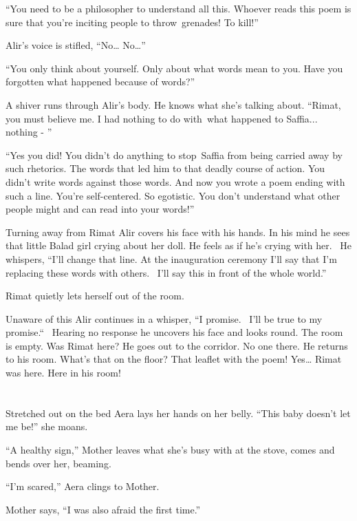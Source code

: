 \documentclass[twoside,11pt]{book}
\begin{document}
``You need to be a philosopher to understand all this. Whoever reads this poem is sure that you're inciting
people to throw~grenades! To kill!''

Alir's voice is stifled, ``No{\dots} No{\dots}''

``You only think about yourself. Only about what words mean to you. Have you forgotten what happened
because of words?''

A shiver runs through Alir's body. He knows what she's talking about. ``Rimat, you must believe me. I had
nothing to do with~what happened to Saffia... nothing - ''

``Yes you did! You didn't do anything to stop~Saffia from being carried away by such rhetorics. The words
that led him to that deadly course of action. You didn't write words against those words. And now you wrote a poem
ending with such a line. You're self-centered. So egotistic.{ }You
don't understand what other people might and can read into your words!''

Turning away from Rimat Alir covers his face with his hands. In his mind he sees that little Balad girl crying about her
doll. He feels as if he's crying with her. ~He whispers, ``I'll change that line. At the inauguration
ceremony I'll say that I'm replacing these words with others.~ I'll say this in front of the whole
world.''

Rimat quietly lets herself out of the room.

Unaware of this Alir continues in a whisper, ``I promise. \ I'll be true to my promise.``~
Hearing no response he uncovers his face and looks round. The room is empty. Was Rimat here? He goes out to the
corridor. No one there. He returns to his room. What's that on the floor? That leaflet with the poem! Yes{\dots} Rimat
was here. Here in his room!


\bigskip

\chapter{}

Stretched out on the bed Aera lays her hands on her belly. ``This baby doesn't let me be!''
she moans.

``A healthy sign,'' Mother leaves what she's busy with at the stove, comes and bends over her,
beaming.

``I'm scared,'' Aera clings to Mother{.}

Mother says, ``I was also afraid the{ }first time.''
\end{document}
